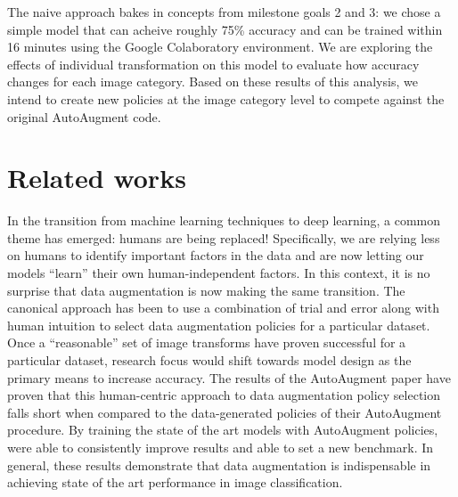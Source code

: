 \documentclass[10pt,twocolumn,letterpaper]{article}
\begin{document}
	The naive approach bakes in concepts from milestone goals 2 and 3: we chose a simple model that can acheive roughly 75\% accuracy and can be trained within 16 minutes using the Google Colaboratory  environment. We are exploring the effects of individual transformation on this model to evaluate how accuracy changes for each image category. Based on these results of this analysis, we intend to create new policies at the image category level to compete against the original AutoAugment code. 

\section{Related works}

	In the transition from machine learning techniques to deep learning, a common theme has emerged: humans are being replaced! Specifically, we are relying less on humans to identify important factors in the data and are now letting our models ``learn'' their own human-independent factors. In this context, it is no surprise that data augmentation is now making the same transition. The canonical approach has been to use a combination of trial and error along with human intuition to select data augmentation policies for a particular dataset. Once a ``reasonable'' set of image transforms have proven successful for a particular dataset, research focus would shift towards model design as the primary means to increase accuracy. The results of the AutoAugment paper have proven that this human-centric approach to data augmentation policy selection falls short when compared to the data-generated policies of their AutoAugment procedure. By training the state of the art models with AutoAugment policies, \cite{Cubuk2018} were able to consistently improve results and able to set a new benchmark. In general, these results demonstrate that data augmentation is indispensable in achieving state of the art performance in image classification. 
\end{document}
